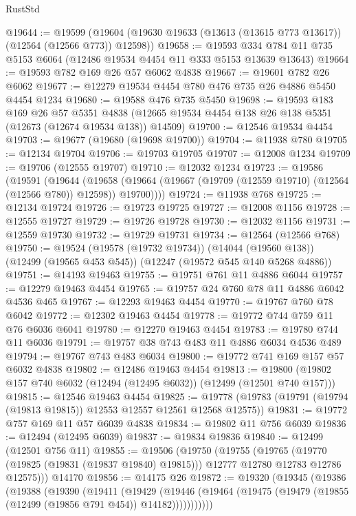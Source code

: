 \begin{lexlean}{RustStd}
\begin{coremodule}
{\begin{coremodule}
{{{{{{{{{{{{{{{{{{{{{{{{{{{{{{{{{{{{{{{{{{{{{{{{{{{{{{{{{{{{{{{{{{{{{{{{{{{{{{{{@19644 := @19599
    (@19604 (@19630 @19633 (@13613 (@13615 @773 @13617)) (@12564 (@12566 @773)) @12598))
@19658 := @19593 @334 @784 @11 @735 @5153 @6064 (@12486 @19534 @4454 @11 @333 @5153 @13639 @13643)
@19664 := @19593 @782 @169 @26 @57 @6062 @4838
@19667 := @19601 @782 @26 @6062
@19677 := @12279 @19534 @4454 @780 @476 @735 @26 @4886 @5450 @4454 @1234
@19680 := @19588 @476 @735 @5450
@19698 := @19593
    @183
    @169
    @26
    @57
    @5351
    @4838
    (@12665 @19534 @4454 @138 @26 @138 @5351 (@12673 (@12674 @19534 @138)) @14509)
@19700 := @12546 @19534 @4454
@19703 := @19677 (@19680 (@19698 @19700))
@19704 := @11938 @780
@19705 := @12134 @19704
@19706 := @19703 @19705
@19707 := @12008 @1234
@19709 := @19706 (@12555 @19707)
@19710 := @12032 @1234
@19723 := @19586
    (@19591
      (@19644
        (@19658 (@19664 (@19667 (@19709 (@12559 @19710) (@12564 (@12566 @780)) @12598)) @19700))))
@19724 := @11938 @768
@19725 := @12134 @19724
@19726 := @19723 @19725
@19727 := @12008 @1156
@19728 := @12555 @19727
@19729 := @19726 @19728
@19730 := @12032 @1156
@19731 := @12559 @19730
@19732 := @19729 @19731
@19734 := @12564 (@12566 @768)
@19750 := @19524
    (@19578 (@19732 @19734))
    (@14044 (@19560 @138))
    (@12499 (@19565 @453 @545))
    (@12247 (@19572 @545 @140 @5268 @4886))
@19751 := @14193 @19463
@19755 := @19751 @761 @11 @4886 @6044
@19757 := @12279 @19463 @4454
@19765 := @19757 @24 @760 @78 @11 @4886 @6042 @4536 @465
@19767 := @12293 @19463 @4454
@19770 := @19767 @760 @78 @6042
@19772 := @12302 @19463 @4454
@19778 := @19772 @744 @759 @11 @76 @6036 @6041
@19780 := @12270 @19463 @4454
@19783 := @19780 @744 @11 @6036
@19791 := @19757 @38 @743 @483 @11 @4886 @6034 @4536 @489
@19794 := @19767 @743 @483 @6034
@19800 := @19772 @741 @169 @157 @57 @6032 @4838
@19802 := @12486 @19463 @4454
@19813 := @19800 (@19802 @157 @740 @6032 (@12494 (@12495 @6032)) (@12499 (@12501 @740 @157)))
@19815 := @12546 @19463 @4454
@19825 := @19778 (@19783 (@19791 (@19794 (@19813 @19815)) @12553 @12557 @12561 @12568 @12575))
@19831 := @19772 @757 @169 @11 @57 @6039 @4838
@19834 := @19802 @11 @756 @6039
@19836 := @12494 (@12495 @6039)
@19837 := @19834 @19836
@19840 := @12499 (@12501 @756 @11)
@19855 := @19506
    (@19750
      (@19755
        (@19765
          (@19770 (@19825 (@19831 (@19837 @19840) @19815)))
          @12777
          @12780
          @12783
          @12786
          @12575)))
    @14170
@19856 := @14175 @26
@19872 := @19320
    (@19345
      (@19386
        (@19388
          (@19390
            (@19411
              (@19429
                (@19446
                  (@19464 (@19475 (@19479 (@19855 (@12499 (@19856 @791 @454)) @14182)))))))))))
}}}}}}}}}}}}}}}}}}}}}}}}}}}}}}}}}}}}}}}}}}}}}}}}}}}}}}}}}}}}}}}}}}}}}}}}}}}}}}}}
\end{coremodule}}
\end{coremodule}
\end{lexlean}

